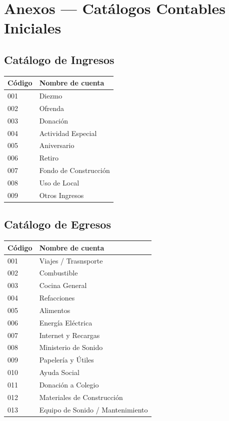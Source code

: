 \documentclass[11pt,a4paper]{article}
\begin{document}
	\newpage
	
	
	
	\section{Anexos — Catálogos Contables Iniciales}
	
	\subsection{Catálogo de Ingresos}
	\begin{table}[h!]
		\centering
		\renewcommand{\arraystretch}{1.1}
		\begin{tabularx}{0.6\textwidth}{l X}
			\toprule
			\textbf{Código} & \textbf{Nombre de cuenta} \\
			\midrule
			001 & Diezmo \\
			002 & Ofrenda \\
			003 & Donación \\
			004 & Actividad Especial \\
			005 & Aniversario \\
			006 & Retiro \\
			007 & Fondo de Construcción \\
			008 & Uso de Local \\
			009 & Otros Ingresos \\
			\bottomrule
		\end{tabularx}
	\end{table}
	
	\subsection{Catálogo de Egresos}
	\begin{table}[h!]
		\centering
		\renewcommand{\arraystretch}{1.1}
		\begin{tabularx}{0.8\textwidth}{l X}
			\toprule
			\textbf{Código} & \textbf{Nombre de cuenta} \\
			\midrule
			001 & Viajes / Trasnsporte \\
			002 & Combustible \\
			003 & Cocina General \\
			004 & Refacciones \\
			005 & Alimentos \\
			006 & Energía Eléctrica \\
			007 & Internet y Recargas \\
			008 & Ministerio de Sonido \\
			009 & Papelería y Útiles \\
			010 & Ayuda Social \\
			011 & Donación a Colegio \\
			012 & Materiales de Construcción \\
			013 & Equipo de Sonido / Mantenimiento \\
			\bottomrule
		\end{tabularx}
	\end{table}
	
\end{document}
